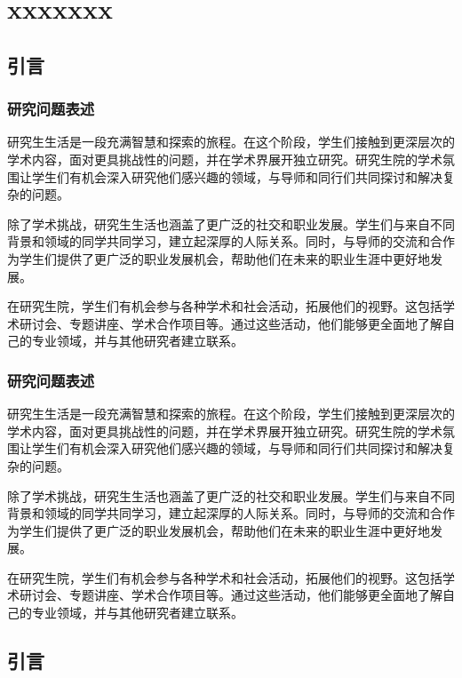 \clearpage

\section{xxxxxxx}

\subsection{引言}

\subsubsection{研究问题表述}
研究生生活是一段充满智慧和探索的旅程。在这个阶段，学生们接触到更深层次的学术内容，面对更具挑战性的问题，并在学术界展开独立研究。研究生院的学术氛围让学生们有机会深入研究他们感兴趣的领域，与导师和同行们共同探讨和解决复杂的问题。

除了学术挑战，研究生生活也涵盖了更广泛的社交和职业发展。学生们与来自不同背景和领域的同学共同学习，建立起深厚的人际关系。同时，与导师的交流和合作为学生们提供了更广泛的职业发展机会，帮助他们在未来的职业生涯中更好地发展。

在研究生院，学生们有机会参与各种学术和社会活动，拓展他们的视野。这包括学术研讨会、专题讲座、学术合作项目等。通过这些活动，他们能够更全面地了解自己的专业领域，并与其他研究者建立联系。
\subsubsection{研究问题表述}
研究生生活是一段充满智慧和探索的旅程。在这个阶段，学生们接触到更深层次的学术内容，面对更具挑战性的问题，并在学术界展开独立研究。研究生院的学术氛围让学生们有机会深入研究他们感兴趣的领域，与导师和同行们共同探讨和解决复杂的问题。

除了学术挑战，研究生生活也涵盖了更广泛的社交和职业发展。学生们与来自不同背景和领域的同学共同学习，建立起深厚的人际关系。同时，与导师的交流和合作为学生们提供了更广泛的职业发展机会，帮助他们在未来的职业生涯中更好地发展。

在研究生院，学生们有机会参与各种学术和社会活动，拓展他们的视野。这包括学术研讨会、专题讲座、学术合作项目等。通过这些活动，他们能够更全面地了解自己的专业领域，并与其他研究者建立联系。

\subsection{引言}

